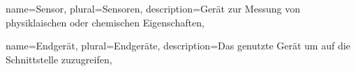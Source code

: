 \makenoidxglossaries
{}
{
	name=Sensor,
	plural=Sensoren,
	description={Gerät zur Messung von physiklaischen oder chemischen Eigenschaften},
}

 {
	name=Endgerät,
	plural=Endgeräte,
    description={Das genutzte Gerät um auf die Schnittstelle zuzugreifen},
}

